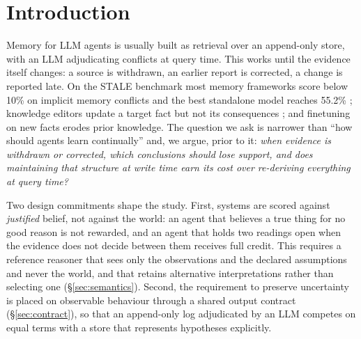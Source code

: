 \documentclass[11pt]{article}
\begin{document}
\begin{abstract}
knowledge updates, which score the latest self-report as truth, the semantics' refusal to assume recency costs it most of its coverage, which we report as a mismatch of scoring targets. We report the pre-registered hypotheses, every negative result, and measured costs (\$\spendTotal{} in total).
\end{abstract}

\section{Introduction}
Memory for LLM agents is usually built as retrieval over an append-only store, with an LLM adjudicating conflicts at query time. This works until the evidence itself changes: a source is withdrawn, an earlier report is corrected, a change is reported late. On the STALE benchmark most memory frameworks score below 10\% on implicit memory conflicts and the best standalone model reaches 55.2\% \citep{stale2026}; knowledge editors update a target fact but not its consequences \citep{rippleedits}; and finetuning on new facts erodes prior knowledge. The question we ask is narrower than ``how should agents learn continually'' and, we argue, prior to it: \emph{when evidence is withdrawn or corrected, which conclusions should lose support, and does maintaining that structure at write time earn its cost over re-deriving everything at query time?}

Two design commitments shape the study. First, systems are scored against \emph{justified} belief, not against the world: an agent that believes a true thing for no good reason is not rewarded, and an agent that holds two readings open when the evidence does not decide between them receives full credit. This requires a reference reasoner that sees only the observations and the declared assumptions and never the world, and that retains alternative interpretations rather than selecting one (\S\ref{sec:semantics}). Second, the requirement to preserve uncertainty is placed on observable behaviour through a shared output contract (\S\ref{sec:contract}), so that an append-only log adjudicated by an LLM competes on equal terms with a store that represents hypotheses explicitly.
\end{document}
